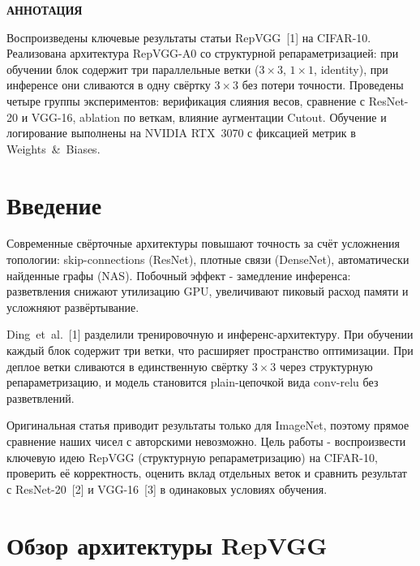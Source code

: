 \documentclass[12pt,a4paper]{article}
\begin{document}

\begin{center}
\textbf{АННОТАЦИЯ}
\end{center}

Воспроизведены ключевые результаты статьи RepVGG~[1] на CIFAR-10. Реализована архитектура RepVGG-A0 со структурной репараметризацией: при обучении блок содержит три параллельные ветки ($3\times3$, $1\times1$, identity), при инференсе они сливаются в одну свёртку $3\times3$ без потери точности. Проведены четыре группы экспериментов: верификация слияния весов, сравнение с ResNet-20 и VGG-16, ablation по веткам, влияние аугментации Cutout. Обучение и логирование выполнены на NVIDIA RTX~3070 с фиксацией метрик в Weights~\&~Biases.

\clearpage
\tableofcontents
\clearpage


\section{Введение}

Современные свёрточные архитектуры повышают точность за счёт усложнения топологии: skip-connections (ResNet), плотные связи (DenseNet), автоматически найденные графы (NAS). Побочный эффект - замедление инференса: разветвления снижают утилизацию GPU, увеличивают пиковый расход памяти и усложняют развёртывание.

Ding~et~al.~[1] разделили тренировочную и инференс-архитектуру. При обучении каждый блок содержит три ветки, что расширяет пространство оптимизации. При деплое ветки сливаются в единственную свёртку $3\times3$ через структурную репараметризацию, и модель становится plain-цепочкой вида conv-relu без разветвлений.

Оригинальная статья приводит результаты только для ImageNet, поэтому прямое сравнение наших чисел с авторскими невозможно. Цель работы - воспроизвести ключевую идею RepVGG (структурную репараметризацию) на CIFAR-10, проверить её корректность, оценить вклад отдельных веток и сравнить результат с ResNet-20~[2] и VGG-16~[3] в одинаковых условиях обучения.


\section{Обзор архитектуры RepVGG}
\end{document}

